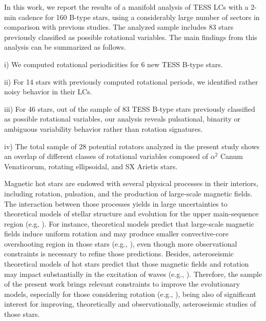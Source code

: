 \documentclass[RNAAS]{aastex63}
\begin{document}
In this work, we report the results of a manifold analysis of TESS LCs with a 2-min cadence for 160 B-type stars, using a considerably large number of sectors in comparison with previous studies. The analyzed sample includes 83 stars previously classified as possible rotational variables. The main findings from this analysis can be summarized as follows.

i) We computed rotational periodicities for 6 new TESS B-type stars.

ii) For 14 stars with previously computed rotational periods, we identified rather noisy behavior in their LCs.

iii) For 46 stars, out of the sample of 83 TESS B-type stars previously classified as possible rotational variables, our analysis reveals pulsational, binarity or ambiguous variability behavior rather than rotation signatures.

iv) The total sample of 28 potential rotators analyzed in the present study shows an overlap of different classes of rotational variables composed of $\alpha^2$ Canum Venaticorum, rotating ellipsoidal, and SX Arietis stars.

Magnetic hot stars are endowed with several physical processes in their interiors, including rotation, pulsation, and the production of large-scale magnetic fields. The interaction between those processes yields in large uncertainties to theoretical models of stellar structure and evolution for the upper main-sequence region (e.g, \citealp{Bowman2018}). For instance, theoretical models predict that large-scale magnetic fields induce uniform rotation and may produce smaller convective-core overshooting region in those stars (e.g., \citealp{Browning2004}), even though more observational constraints is necessary to refine those predictions. Besides, asteroseismic theoretical models of hot stars predict that those magnetic fields and rotation may impact substantially in the excitation of waves (e.g., \citealp{Lecoanet2017,Mathis2014}). Therefore, the sample of the present work brings relevant constraints to improve the evolutionary models, especially for those considering rotation (e.g., \citealp{Maeder2009}), being also of significant interest for improving, theoretically and observationally, asteroseismic studies of those stars.
\end{document}
